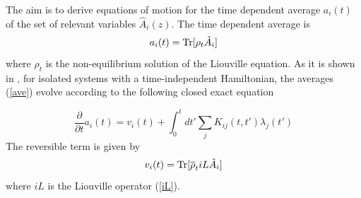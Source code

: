 \documentclass[b5paper,openright,11pt]{book}
\begin{document}
The  aim is  to
derive equations of motion for  the time dependent average $a_i(t)$ of
the set of relevant variables $\hat{A}_i(z)$. The time dependent average
is
\begin{equation}
  a_i(t)={\rm Tr}[\rho_t\hat{A}_i]
  \label{ave}
\end{equation}
where $\rho_t$ is
the non-equilibrium solution of the Liouville equation. As it is shown
in  \cite{Grabert1982},  for  isolated systems  with a time-independent
Hamiltonian,  the   averages  (\ref{ave})  evolve  according   to  the
following closed exact equation

\begin{equation}
\frac{\partial }{\partial t} a_i(t)
= v_i(t) + \int_0^t dt' \sum_j K_{ij}(t,t') \lambda_j(t')
\label{ex}
\end{equation}
The reversible term is given by
\begin{equation}
v_i(t) = {\rm Tr}[\overline{\rho}_t  iL \hat{A}_i]
\label{vit}
\end{equation}
where $iL$ is the Liouville operator (\ref{iL}).
\end{document}
